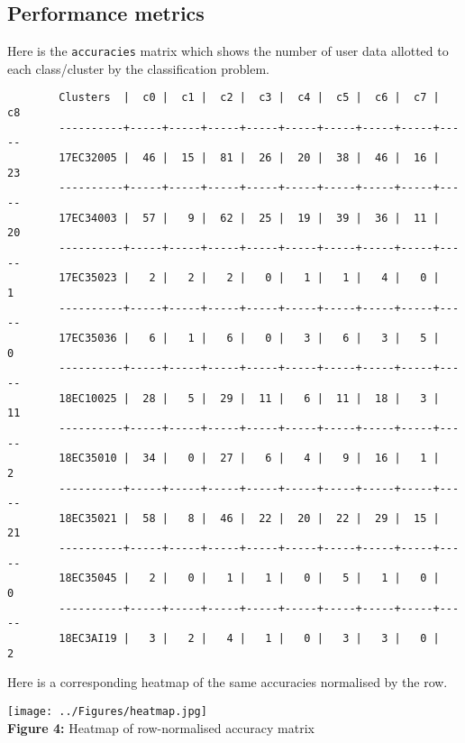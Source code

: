 \documentclass[a4paper,10pt]{article}
\begin{document}
\subsection*{Performance metrics}
	Here is the \texttt{accuracies} matrix which shows the number of user data allotted to each class/cluster by the classification problem.
	
	\begin{verbatim}
		Clusters  |  c0 |  c1 |  c2 |  c3 |  c4 |  c5 |  c6 |  c7 |  c8 
		----------+-----+-----+-----+-----+-----+-----+-----+-----+-----
		17EC32005 |  46 |  15 |  81 |  26 |  20 |  38 |  46 |  16 |  23 
		----------+-----+-----+-----+-----+-----+-----+-----+-----+-----
		17EC34003 |  57 |   9 |  62 |  25 |  19 |  39 |  36 |  11 |  20 
		----------+-----+-----+-----+-----+-----+-----+-----+-----+-----
		17EC35023 |   2 |   2 |   2 |   0 |   1 |   1 |   4 |   0 |   1 
		----------+-----+-----+-----+-----+-----+-----+-----+-----+-----
		17EC35036 |   6 |   1 |   6 |   0 |   3 |   6 |   3 |   5 |   0 
		----------+-----+-----+-----+-----+-----+-----+-----+-----+-----
		18EC10025 |  28 |   5 |  29 |  11 |   6 |  11 |  18 |   3 |  11 
		----------+-----+-----+-----+-----+-----+-----+-----+-----+-----
		18EC35010 |  34 |   0 |  27 |   6 |   4 |   9 |  16 |   1 |   2 
		----------+-----+-----+-----+-----+-----+-----+-----+-----+-----
		18EC35021 |  58 |   8 |  46 |  22 |  20 |  22 |  29 |  15 |  21 
		----------+-----+-----+-----+-----+-----+-----+-----+-----+-----
		18EC35045 |   2 |   0 |   1 |   1 |   0 |   5 |   1 |   0 |   0 
		----------+-----+-----+-----+-----+-----+-----+-----+-----+-----
		18EC3AI19 |   3 |   2 |   4 |   1 |   0 |   3 |   3 |   0 |   2 
	\end{verbatim}
	Here is a corresponding heatmap of the same accuracies normalised by the row.
	\begin{center}
		\texttt{[image: ../Figures/heatmap.jpg]} \\
		\small{\textbf{Figure 4:} Heatmap of row-normalised accuracy matrix}
	\end{center}
\end{document}
